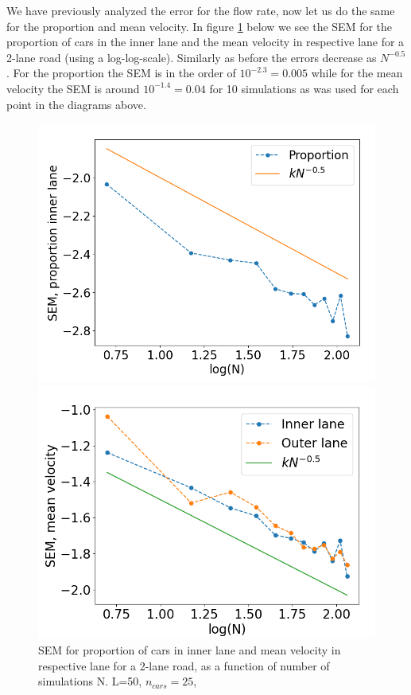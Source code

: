 \documentclass[a4paper,12pt]{article}
\begin{document}
We have previously analyzed the error for the flow rate, now let us do the same for the proportion and mean velocity. In figure \ref{sempv} below we see the SEM for the proportion of cars in the inner lane and the mean velocity in respective lane for a 2-lane road (using a log-log-scale). Similarly as before the errors decrease as $N^{-0.5}$. For the proportion the SEM is in the order of $10^{-2.3} = 0.005$ while for the mean velocity the SEM is around $10^{-1.4} = 0.04$ for 10 simulations as was used for each point in the diagrams above. 
\begin{figure}[H]
	 \centering
    \begin{minipage}{.5\textwidth}
        \centering
        \includegraphics[scale=0.38]{fig11.png}
    \end{minipage}%
    \begin{minipage}{.5\textwidth}
        \centering
        \includegraphics[scale=0.38]{fig12.png}
    \end{minipage}
    \caption{SEM for proportion of cars in inner lane and mean velocity in respective lane for a 2-lane road, as a function of number of simulations N. L=50, $n_{cars}=25$, }
    \label{sempv}
\end{figure}
\end{document}
